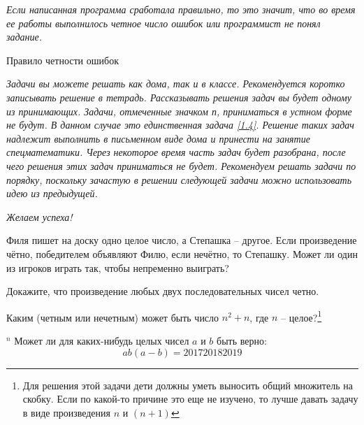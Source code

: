 \epigraph{\textit{Если написанная программа сработала правильно, то это значит, что во время ее работы выполнилось четное число ошибок или программист не понял задание.}}{Правило четности ошибок}

\textit{Задачи вы можете решать как дома, так и в классе. Рекомендуется коротко записывать решение в тетрадь. Рассказывать решения задач вы будет одному из принимающих. Задачи, отмеченные значком п, приниматься в устном форме не будут. В данном случае это единственная задача \ref{1.4}. Решение таких задач надлежит выполнить в письменном виде дома и принести на занятие спецматематики. Через некоторое время часть задач будет разобрана, после чего решения этих задач приниматься не будет. Рекомендуем решать задачи по порядку, поскольку зачастую в решении следующей задачи можно использовать идею из предыдущей.}
\begin{flushright}
	\textit{Желаем успеха!}
\end{flushright}

\begin{thm}
	Филя пишет на доску одно целое число, а Степашка – другое. Если произведение чётно, победителем объявляют Филю, если нечётно, то Степашку. Может ли один из игроков играть так, чтобы непременно выиграть?
\end{thm}

\begin{thm}
	Докажите, что произведение любых двух последовательных чисел четно.
\end{thm}

\begin{thm}
	Каким (четным или нечетным) может быть число  $n^2 + n$, где  $n$ – целое?\footnote{Для решения этой задачи дети должны уметь выносить общий множитель на скобку. Если по какой-то причине это еще не изучено, то лучше давать задачу в виде произведения $ n $ и $ ( n+1) $}
\end{thm}

\begin{thm}$^n$\label{1.4} Может ли для каких-нибудь целых чисел $a$ и $b$ быть верно:    $$ab(a-b) = 201720182019$$
\end{thm}


